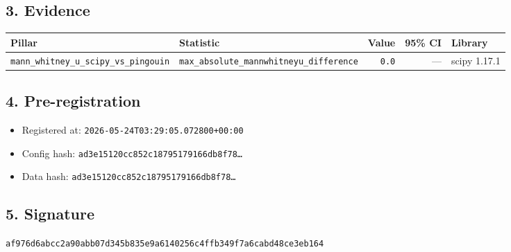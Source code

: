 \documentclass{article}
\begin{document}
\subsection*{3. Evidence}
\begin{tabular}{llrrl}\toprule
\textbf{Pillar} & \textbf{Statistic} & \textbf{Value} & \textbf{95\% CI} & \textbf{Library} \\\midrule
\texttt{mann\_whitney\_u\_scipy\_vs\_pingouin} & \texttt{max\_absolute\_mannwhitneyu\_difference} & \texttt{0.0} & --- & scipy 1.17.1 \\
\bottomrule\end{tabular}
\subsection*{4. Pre-registration}
\begin{itemize}
\item Registered at: \texttt{2026-05-24T03:29:05.072800+00:00}
\item Config hash: \texttt{ad3e15120cc852c18795179166db8f78\dots}
\item Data hash: \texttt{ad3e15120cc852c18795179166db8f78\dots}
\end{itemize}
\subsection*{5. Signature}
\texttt{af976d6abcc2a90abb07d345b835e9a6140256c4ffb349f7a6cabd48ce3eb164}\\
\end{document}
